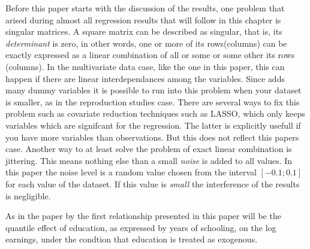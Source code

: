 \documentclass[12pt,a4paper]{article}
\begin{document}
Before this paper starts with the discussion of the results, one problem
that arised during almost all regression results that will follow in
this chapter is singular matrices. A square matrix can be described as
singular, that is, its \textit{determinant} is zero, in other words, one
or more of its rows(columns) can be exactly expressed as a linear
combination of all or some or some other its rows (columns). In the
multivariate data case, like the one in this paper, this can happen if
there are linear interdependances among the variables. Since
\textcite{brunello} adds many dummy variables it is possible to run into
this problem when your dataset is smaller, as in the reproduction
studies case. There are several ways to fix this problem such as
covariate reduction techniques such as LASSO, which only keeps variables
which are signifcant for the regression. The latter is explicitly
usefull if you have more variables than observations. But this does not
reflect this papers case. Another way to at least solve the problem of
exact linear combination is jittering. This means nothing else than a
small \textit{noise} is added to all values. In this paper the noise
level is a random value chosen from the interval \([-0.1;0.1]\) for each
value of the dataset. If this value is \textit{small} the interference
of the results is negligible.

As in the paper by \textcite{brunello} the first relationship presented
in this paper will be the quantile effect of education, as expressed by
years of schooling, on the log earnings, under the condtion that
education is treated as exogenous.
\end{document}
